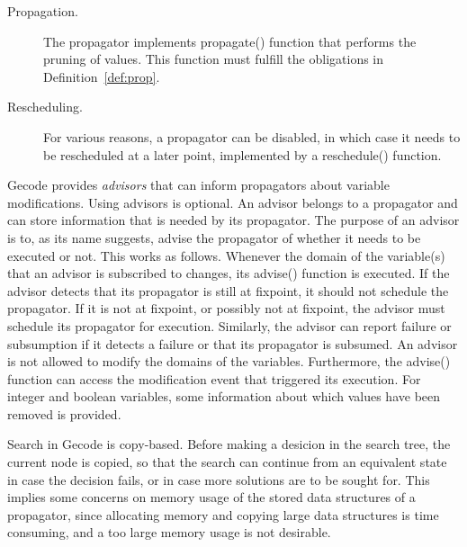\documentclass[a4paper,11pt]{article}
\numberwithin{equation}{section}
\begin{document}
\begin{description}
  \item[Propagation.] The propagator implements propagate() function
    that performs the pruning of values. This function must fulfill
    the obligations in Definition~\ref{def:prop}.

  \item[Rescheduling.] For various reasons, a propagator can be disabled,
    in which case it needs to be rescheduled at a later point, implemented
    by a reschedule() function.

\end{description}


Gecode provides \emph{advisors} that can inform propagators about variable
modifications.
Using advisors is optional.
An advisor belongs to a propagator and can store information that is needed by
its propagator. The purpose of an advisor is to, as its name suggests, advise
the propagator of whether it needs to be executed or not. This works as follows.
Whenever the domain
of the variable(s) that an advisor is subscribed to changes, its advise()
function is executed. If the advisor detects that its propagator is still
at fixpoint, it should not schedule the propagator. If it is not at fixpoint,
or possibly not at fixpoint, the advisor must schedule its propagator for
execution. Similarly, the advisor can report failure or subsumption
if it detects a failure or that its propagator is subsumed. An advisor
is not allowed to modify the domains of the variables. 
Furthermore, the advise() function can access
the modification event that triggered its execution. 
For integer and boolean variables, some information about which values
have been removed is provided.

Search in Gecode is copy-based. Before making a desicion in the search tree, the
current node is copied, so that the search can continue from an equivalent 
state in case the decision fails, or in case more solutions are to be sought for.
This implies some concerns on memory usage of the stored data structures
of a propagator, since allocating memory and copying large data structures
is time consuming, and a too large memory usage is not desirable.



\end{document}
